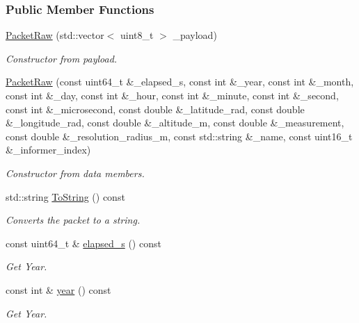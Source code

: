 \subsubsection*{Public Member Functions}
\begin{DoxyCompactItemize}
\item 
\hyperlink{classosse_1_1collaborate_1_1_packet_raw_a77d54b0f3adb1e32ab58ee5104bae39d}{Packet\+Raw} (std\+::vector$<$ uint8\+\_\+t $>$ \+\_\+payload)
\begin{DoxyCompactList}\small\item\em Constructor from payload. \end{DoxyCompactList}\item 
\hyperlink{classosse_1_1collaborate_1_1_packet_raw_a16cbaab494437fb520a9600cd4819319}{Packet\+Raw} (const uint64\+\_\+t \&\+\_\+elapsed\+\_\+s, const int \&\+\_\+year, const int \&\+\_\+month, const int \&\+\_\+day, const int \&\+\_\+hour, const int \&\+\_\+minute, const int \&\+\_\+second, const int \&\+\_\+microsecond, const double \&\+\_\+latitude\+\_\+rad, const double \&\+\_\+longitude\+\_\+rad, const double \&\+\_\+altitude\+\_\+m, const double \&\+\_\+measurement, const double \&\+\_\+resolution\+\_\+radius\+\_\+m, const std\+::string \&\+\_\+name, const uint16\+\_\+t \&\+\_\+informer\+\_\+index)
\begin{DoxyCompactList}\small\item\em Constructor from data members. \end{DoxyCompactList}\item 
std\+::string \hyperlink{classosse_1_1collaborate_1_1_packet_raw_a838d1364ab1defdff4abcabf5369827a}{To\+String} () const
\begin{DoxyCompactList}\small\item\em Converts the packet to a string. \end{DoxyCompactList}\item 
const uint64\+\_\+t \& \hyperlink{classosse_1_1collaborate_1_1_packet_raw_ae6ee78a3e857b59dc78351ebd18f032e}{elapsed\+\_\+s} () const
\begin{DoxyCompactList}\small\item\em Get Year. \end{DoxyCompactList}\item 
const int \& \hyperlink{classosse_1_1collaborate_1_1_packet_raw_a0e67ebb309b3564df39c6f2f366f4563}{year} () const
\begin{DoxyCompactList}\small\item\em Get Year. \end{DoxyCompactList}\item 

\end{DoxyCompactItemize}
